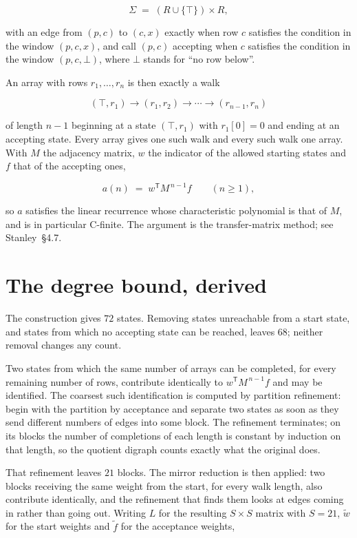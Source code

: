 \documentclass[11pt]{article}
\theoremstyle{definition}
\begin{document}
\[\Sigma \;=\; (R \cup \{\top\}) \times R,\]

with an edge from $(p,c)$ to $(c,x)$ exactly when row $c$ satisfies the condition in the window $(p,c,x)$, and call $(p,c)$ accepting when $c$ satisfies the condition in the window $(p,c,\bot)$, where $\bot$ stands for ``no row below''.

An array with rows $r_1,\dots,r_n$ is then exactly a walk

\[(\top,r_1) \to (r_1,r_2) \to \cdots \to (r_{n-1},r_n)\]

of length $n-1$ beginning at a state $(\top,r_1)$ with $r_1[0]=0$ and ending at an accepting state. Every array gives one such walk and every such walk one array. With $M$ the adjacency matrix, $w$ the indicator of the allowed starting states and $f$ that of the accepting ones,

\[a(n) \;=\; w^{\mathsf T} M^{\,n-1} f \qquad (n \ge 1),\]

so $a$ satisfies the linear recurrence whose characteristic polynomial is that of $M$, and is in particular C-finite. The argument is the transfer-matrix method; see Stanley~\S4.7.

\section{The degree bound, derived}

The construction gives $72$ states. Removing states unreachable from a start state, and states from which no accepting state can be reached, leaves $68$; neither removal changes any count.

Two states from which the same number of arrays can be completed, for every remaining number of rows, contribute identically to $w^{\mathsf T}M^{\,n-1}f$ and may be identified. The coarsest such identification is computed by partition refinement: begin with the partition by acceptance and separate two states as soon as they send different numbers of edges into some block. The refinement terminates; on its blocks the number of completions of each length is constant by induction on that length, so the quotient digraph counts exactly what the original does.

That refinement leaves $21$ blocks. The mirror reduction is then applied: two blocks receiving the same weight from the start, for every walk length, also contribute identically, and the refinement that finds them looks at edges coming in rather than going out. Writing $L$ for the resulting $S \times S$ matrix with $S = 21$, $\tilde w$ for the start weights and $\tilde f$ for the acceptance weights,
\end{document}
